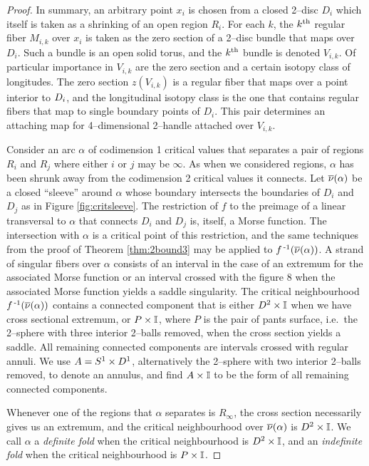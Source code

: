 \begin{proof}
	In summary, an arbitrary point $x_i$ is chosen from a closed 2--disc $D_i$ which itself is taken as a shrinking of an open region $R_i$.
	For each $k$, the $k^{\text{th}}$ regular fiber $M_{i,k}$ over $x_i$ is taken as the zero section of a 2--disc bundle that maps over $D_i$.
	Such a bundle is an open solid torus, and the $k^{\text{th}}$ bundle is denoted $V_{i,k}$.
	Of particular importance in $V_{i,k}$ are the zero section and a certain isotopy class of longitudes.
	The zero section $z(V_{i,k})$ is a regular fiber that maps over a point interior to $D_i$, and the longitudinal isotopy class is the one that contains regular fibers that map to single boundary points of $D_i$.
	This pair determines an attaching map for 4--dimensional 2--handle attached over $V_{i,k}$.
	

	
	Consider an arc $\alpha$ of codimension 1 critical values that separates a pair of regions $R_i$ and $R_j$ where either $i$ or $j$ may be $\infty$.
	As when we considered regions, $\alpha$ has been shrunk away from the codimension 2 critical values it connects.
	Let $\overline{\nu}(\alpha)$ be a closed ``sleeve'' around $\alpha$ whose boundary intersects the boundaries of $D_i$ and $D_j$ as in Figure \ref{fig:critsleeve}.
	The restriction of $f$ to the preimage of a linear transversal to $\alpha$ that connects $D_i$ and $D_j$ is, itself, a Morse function.
	The intersection with $\alpha$ is a critical point of this restriction, and the same techniques from the proof of Theorem \ref{thm:2bound3} may be applied to $f^{\,\text{-}1}(\overline{\nu}(\alpha))$.
	A strand of singular fibers over $\alpha$ consists of an interval in the case of an extremum for the associated Morse function or an interval crossed with the figure 8 when the associated Morse function yields a saddle singularity.
	The critical neighbourhood $f^{\,\text{-}1}(\overline{\nu}(\alpha))$ contains a connected component that is either $D^2\times\mathbb{I}$ when we have cross sectional extremum, or $P\times\mathbb{I}$, where $P$ is the pair of pants surface, i.e.\ the 2--sphere with three interior 2--balls removed, when the cross section yields a saddle.
	All remaining connected components are intervals crossed with regular annuli.
	We use $A=S^1\times D^1$, alternatively the 2--sphere with two interior 2--balls removed, to denote an annulus, and find $A\times\mathbb{I}$ to be the form of all remaining connected components.
	
	Whenever one of the regions that $\alpha$ separates is $R_\infty$, the cross section necessarily gives us an extremum, and the critical neighbourhood over $\overline{\nu}(\alpha)$ is $D^2\times\mathbb{I}$.
	We call $\alpha$ a \emph{definite fold} when the critical neighbourhood is $D^2\times\mathbb{I}$, and an \emph{indefinite fold} when the critical neighbourhood is $P\times\mathbb{I}$.
	

\end{proof}
